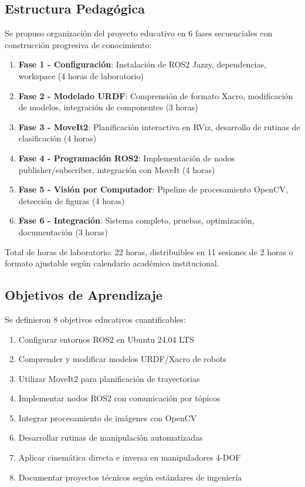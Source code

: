 \subsection{Estructura Pedagógica}

Se propuso organización del proyecto educativo en 6 fases secuenciales con construcción progresiva de conocimiento:

\begin{enumerate}
    \item \textbf{Fase 1 - Configuración}: Instalación de ROS2 Jazzy, dependencias, workspace (4 horas de laboratorio)
    \item \textbf{Fase 2 - Modelado URDF}: Comprensión de formato Xacro, modificación de modelos, integración de componentes (3 horas)
    \item \textbf{Fase 3 - MoveIt2}: Planificación interactiva en RViz, desarrollo de rutinas de clasificación (4 horas)
    \item \textbf{Fase 4 - Programación ROS2}: Implementación de nodos publisher/subscriber, integración con MoveIt (4 horas)
    \item \textbf{Fase 5 - Visión por Computador}: Pipeline de procesamiento OpenCV, detección de figuras (4 horas)
    \item \textbf{Fase 6 - Integración}: Sistema completo, pruebas, optimización, documentación (3 horas)
\end{enumerate}

Total de horas de laboratorio: 22 horas, distribuibles en 11 sesiones de 2 horas o formato ajustable según calendario académico institucional.

\subsection{Objetivos de Aprendizaje}

Se definieron 8 objetivos educativos cuantificables:

\begin{enumerate}
    \item Configurar entornos ROS2 en Ubuntu 24.04 LTS
    \item Comprender y modificar modelos URDF/Xacro de robots
    \item Utilizar MoveIt2 para planificación de trayectorias
    \item Implementar nodos ROS2 con comunicación por tópicos
    \item Integrar procesamiento de imágenes con OpenCV
    \item Desarrollar rutinas de manipulación automatizadas
    \item Aplicar cinemática directa e inversa en manipuladores 4-DOF
    \item Documentar proyectos técnicos según estándares de ingeniería
\end{enumerate}

